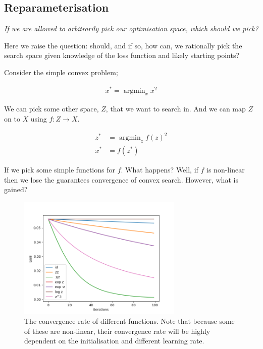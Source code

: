 \newpage
\subsection{Reparameterisation}\label{reparameterisation}

\begin{displayquote}
  \textsl{If we are allowed to arbitrarily pick our optimisation space, which should we pick?}
\end{displayquote}

Here we raise the question: should, and if so, how can, we rationally pick the
search space given knowledge of the loss function and likely starting points?

Consider the simple convex problem;

\begin{align*}
  x^{* } = \mathop{\text{argmin}}_{x} x^2
\end{align*}

We can pick some other space, $Z$, that we want to search in. And we can map $Z$ on to $X$ using $f: Z \to X$.

\begin{align*}
  z^{* } &=\mathop{\text{argmin}}_{z} f(z)^2 \\
    x^{* } &= f(z^{* })
\end{align*}

If we pick some simple functions for $f$. What happens? Well, if $f$ is non-linear
then we lose the guarantees convergence of convex search. However, what is gained?

\begin{figure}[h!]
\centering
\includegraphics[width=0.7\textwidth,height=0.35\textheight]{../../pictures/figures/reparam-ce-04.png}
\caption{The convergence rate of different functions. Note that because some of these are non-linear, their convergence rate will be highly dependent on the initialisation and different learning rate.}
\end{figure}

